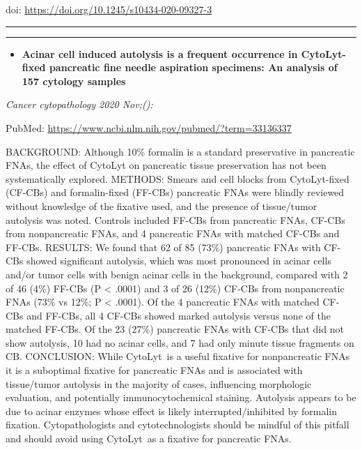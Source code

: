 \documentclass[
]{article}
\providecommand{\tightlist}{%
  \setlength{\itemsep}{0pt}\setlength{\parskip}{0pt}}
\begin{document}
doi: \url{https://doi.org/10.1245/s10434-020-09327-3}

\begin{center}\rule{0.5\linewidth}{0.5pt}\end{center}

\begin{center}\rule{0.5\linewidth}{0.5pt}\end{center}

\begin{itemize}
\tightlist
\item
  \textbf{Acinar cell induced autolysis is a frequent occurrence in
  CytoLyt-fixed pancreatic fine needle aspiration specimens: An analysis
  of 157 cytology samples}
\end{itemize}

\emph{Cancer cytopathology 2020 Nov;():}

PubMed: \url{https://www.ncbi.nlm.nih.gov/pubmed/?term=33136337}

BACKGROUND: Although 10\% formalin is a standard preservative in
pancreatic FNAs, the effect of CytoLyt on pancreatic tissue preservation
has not been systematically explored. METHODS: Smears and cell blocks
from CytoLyt-fixed (CF-CBs) and formalin-fixed (FF-CBs) pancreatic FNAs
were blindly reviewed without knowledge of the fixative used, and the
presence of tissue/tumor autolysis was noted. Controls included FF-CBs
from pancreatic FNAs, CF-CBs from nonpancreatic FNAs, and 4 pancreatic
FNAs with matched CF-CBs and FF-CBs. RESULTS: We found that 62 of 85
(73\%) pancreatic FNAs with CF-CBs showed significant autolysis, which
was most pronounced in acinar cells and/or tumor cells with benign
acinar cells in the background, compared with 2 of 46 (4\%) FF-CBs (P
\textless{} .0001) and 3 of 26 (12\%) CF-CBs from nonpancreatic FNAs
(73\% vs 12\%; P \textless{} .0001). Of the 4 pancreatic FNAs with
matched CF-CBs and FF-CBs, all 4 CF-CBs showed marked autolysis versus
none of the matched FF-CBs. Of the 23 (27\%) pancreatic FNAs with CF-CBs
that did not show autolysis, 10 had no acinar cells, and 7 had only
minute tissue fragments on CB. CONCLUSION: While CytoLyt~is a useful
fixative for nonpancreatic FNAs it is a suboptimal fixative for
pancreatic FNAs and is associated with tissue/tumor autolysis in the
majority of cases, influencing morphologic evaluation, and potentially
immunocytochemical staining. Autolysis appears to be due to acinar
enzymes whose effect is likely interrupted/inhibited by formalin
fixation. Cytopathologists and cytotechnologists should be mindful of
this pitfall and should avoid using CytoLyt~as a fixative for pancreatic
FNAs.
\end{document}

